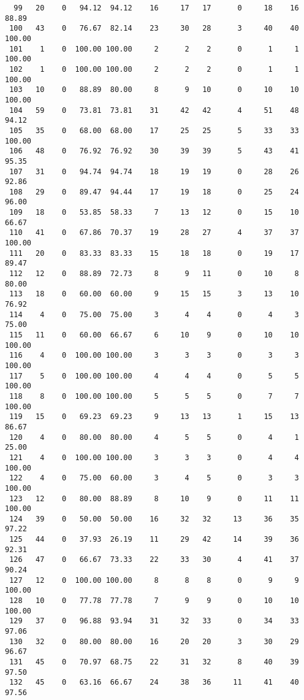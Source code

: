 \begin{verbatim}
  99   20    0   94.12  94.12    16     17   17      0     18    16    88.89
 100   43    0   76.67  82.14    23     30   28      3     40    40   100.00
 101    1    0  100.00 100.00     2      2    2      0      1     1   100.00
 102    1    0  100.00 100.00     2      2    2      0      1     1   100.00
 103   10    0   88.89  80.00     8      9   10      0     10    10   100.00
 104   59    0   73.81  73.81    31     42   42      4     51    48    94.12
 105   35    0   68.00  68.00    17     25   25      5     33    33   100.00
 106   48    0   76.92  76.92    30     39   39      5     43    41    95.35
 107   31    0   94.74  94.74    18     19   19      0     28    26    92.86
 108   29    0   89.47  94.44    17     19   18      0     25    24    96.00
 109   18    0   53.85  58.33     7     13   12      0     15    10    66.67
 110   41    0   67.86  70.37    19     28   27      4     37    37   100.00
 111   20    0   83.33  83.33    15     18   18      0     19    17    89.47
 112   12    0   88.89  72.73     8      9   11      0     10     8    80.00
 113   18    0   60.00  60.00     9     15   15      3     13    10    76.92
 114    4    0   75.00  75.00     3      4    4      0      4     3    75.00
 115   11    0   60.00  66.67     6     10    9      0     10    10   100.00
 116    4    0  100.00 100.00     3      3    3      0      3     3   100.00
 117    5    0  100.00 100.00     4      4    4      0      5     5   100.00
 118    8    0  100.00 100.00     5      5    5      0      7     7   100.00
 119   15    0   69.23  69.23     9     13   13      1     15    13    86.67
 120    4    0   80.00  80.00     4      5    5      0      4     1    25.00
 121    4    0  100.00 100.00     3      3    3      0      4     4   100.00
 122    4    0   75.00  60.00     3      4    5      0      3     3   100.00
 123   12    0   80.00  88.89     8     10    9      0     11    11   100.00
 124   39    0   50.00  50.00    16     32   32     13     36    35    97.22
 125   44    0   37.93  26.19    11     29   42     14     39    36    92.31
 126   47    0   66.67  73.33    22     33   30      4     41    37    90.24
 127   12    0  100.00 100.00     8      8    8      0      9     9   100.00
 128   10    0   77.78  77.78     7      9    9      0     10    10   100.00
 129   37    0   96.88  93.94    31     32   33      0     34    33    97.06
 130   32    0   80.00  80.00    16     20   20      3     30    29    96.67
 131   45    0   70.97  68.75    22     31   32      8     40    39    97.50
 132   45    0   63.16  66.67    24     38   36     11     41    40    97.56

\end{verbatim}
